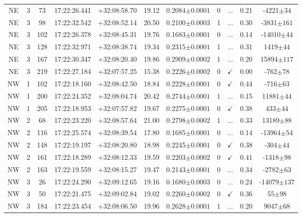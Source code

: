 \begin{landscape}
\begin{longtable}{ccccccccccc}
	NE & 3 & 73 & 17:22:26.441 & +32:08:58.70 & 19.12 & 0.2084$\pm{0.0001}$ & 0 & ... & 0.21 & -4221$\pm{34}$ \\
	NE & 3 & 98 & 17:22:32.542 & +32:08:52.14 & 20.50 & 0.2100$\pm{0.0003}$ & 1 & ... & 0.30 & -3831$\pm{161}$ \\
	NE & 3 & 102 & 17:22:26.378 & +32:08:45.31 & 19.76 & 0.1683$\pm{0.0001}$ & 0 & ... & 0.14 & -14010$\pm{44}$ \\
	NE & 3 & 128 & 17:22:32.971 & +32:08:38.74 & 19.34 & 0.2315$\pm{0.0001}$ & 1 & ... & 0.31 & 1419$\pm{44}$ \\
	NE & 3 & 167 & 17:22:30.347 & +32:08:20.40 & 19.86 & 0.2909$\pm{0.0002}$ & 1 & ... & 0.20 & 15894$\pm{117}$ \\
	NE & 3 & 219 & 17:22:27.184 & +32:07:57.25 & 15.38 & 0.2226$\pm{0.0002}$ & 0 & $\checkmark$ & 0.00 & -762$\pm{78}$ \\
	NW & 1 & 102 & 17:22:18.160 & +32:08:42.50 & 18.84 & 0.2228$\pm{0.0001}$ & 0 & $\checkmark$ & 0.44 & -716$\pm{63}$ \\
	NW & 1 & 200 & 17:22:24.352 & +32:08:04.74 & 20.42 & 0.2744$\pm{0.0001}$ & 1 & ... & 0.15 & 11881$\pm{44}$ \\
	NW & 1 & 205 & 17:22:18.953 & +32:07:57.82 & 19.67 & 0.2275$\pm{0.0001}$ & 0 & $\checkmark$ & 0.38 & 433$\pm{44}$ \\
	NW & 2 & 68 & 17:22:23.220 & +32:08:57.64 & 21.00 & 0.2798$\pm{0.0002}$ & 1 & ... & 0.33 & 13189$\pm{88}$ \\
	NW & 2 & 116 & 17:22:25.574 & +32:08:39.54 & 17.80 & 0.1685$\pm{0.0001}$ & 0 & ... & 0.14 & -13964$\pm{54}$ \\
	NW & 2 & 148 & 17:22:19.197 & +32:08:20.80 & 18.98 & 0.2245$\pm{0.0001}$ & 0 & $\checkmark$ & 0.38 & -304$\pm{44}$ \\
	NW & 2 & 161 & 17:22:18.289 & +32:08:12.33 & 19.59 & 0.2203$\pm{0.0002}$ & 0 & $\checkmark$ & 0.41 & -1318$\pm{98}$ \\
	NW & 2 & 163 & 17:22:19.559 & +32:08:15.27 & 19.47 & 0.2143$\pm{0.0001}$ & 0 & ... & 0.34 & -2782$\pm{63}$ \\
	NW & 3 & 26 & 17:22:24.290 & +32:09:12.65 & 19.16 & 0.1680$\pm{0.0003}$ & 0 & ... & 0.24 & -14079$\pm{137}$ \\
	NW & 3 & 50 & 17:22:21.475 & +32:09:02.84 & 19.02 & 0.2260$\pm{0.0002}$ & 0 & $\checkmark$ & 0.36 & 55$\pm{98}$ \\
	NW & 3 & 184 & 17:22:23.454 & +32:08:06.50 & 19.96 & 0.2628$\pm{0.0001}$ & 1 & ... & 0.20 & 9047$\pm{68}$ \\

\end{longtable}
\end{landscape}
